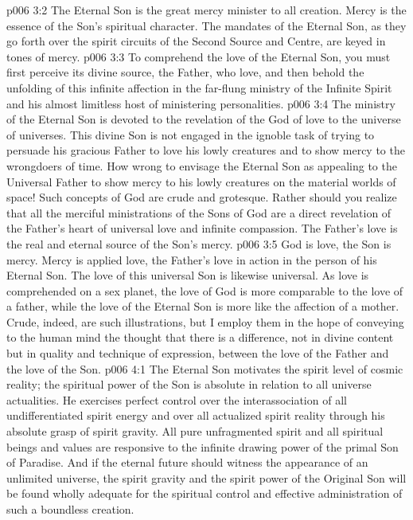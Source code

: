 \vs p006 3:2 The Eternal Son is the great mercy minister to all creation. Mercy is the essence of the Son’s spiritual character. The mandates of the Eternal Son, as they go forth over the spirit circuits of the Second Source and Centre, are keyed in tones of mercy.
\vs p006 3:3 To comprehend the love of the Eternal Son, you must first perceive its divine source, the Father, who  love, and then behold the unfolding of this infinite affection in the far\hyp{}flung ministry of the Infinite Spirit and his almost limitless host of ministering personalities.
\vs p006 3:4 The ministry of the Eternal Son is devoted to the revelation of the God of love to the universe of universes. This divine Son is not engaged in the ignoble task of trying to persuade his gracious Father to love his lowly creatures and to show mercy to the wrongdoers of time. How wrong to envisage the Eternal Son as appealing to the Universal Father to show mercy to his lowly creatures on the material worlds of space! Such concepts of God are crude and grotesque. Rather should you realize that all the merciful ministrations of the Sons of God are a direct revelation of the Father’s heart of universal love and infinite compassion. The Father’s love is the real and eternal source of the Son’s mercy.
\vs p006 3:5 God is love, the Son is mercy. Mercy is applied love, the Father’s love in action in the person of his Eternal Son. The love of this universal Son is likewise universal. As love is comprehended on a sex planet, the love of God is more comparable to the love of a father, while the love of the Eternal Son is more like the affection of a mother. Crude, indeed, are such illustrations, but I employ them in the hope of conveying to the human mind the thought that there is a difference, not in divine content but in quality and technique of expression, between the love of the Father and the love of the Son.
\vs p006 4:1 The Eternal Son motivates the spirit level of cosmic reality; the spiritual power of the Son is absolute in relation to all universe actualities. He exercises perfect control over the interassociation of all undifferentiated spirit energy and over all actualized spirit reality through his absolute grasp of spirit gravity. All pure unfragmented spirit and all spiritual beings and values are responsive to the infinite drawing power of the primal Son of Paradise. And if the eternal future should witness the appearance of an unlimited universe, the spirit gravity and the spirit power of the Original Son will be found wholly adequate for the spiritual control and effective administration of such a boundless creation.
